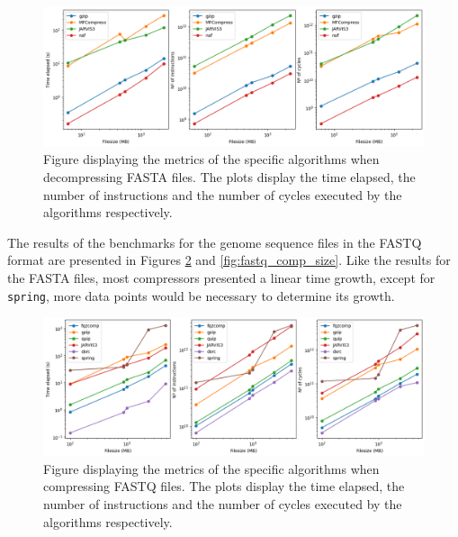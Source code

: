     \begin{figure}[h]
        \centering
        \includegraphics[width=1\textwidth]{figs/fasta_dstats.png}
        \caption[Figure displaying the metrics of the specific algorithms when decompressing FASTA files.] {Figure displaying the metrics of the specific algorithms when decompressing FASTA files. The plots display the time elapsed, the number of instructions and the number of cycles executed by the algorithms respectively.}
        \label{fig:fasta_dstats}
    \end{figure}

    The results of the benchmarks for the genome sequence files in the FASTQ format are presented in Figures \ref{fig:fastq_stats} and \ref{fig:fastq_comp_size}. Like the results for the FASTA files, most compressors presented a linear time growth, except for \texttt{spring}, more data points would be necessary to determine its growth.
    
    \begin{figure}[h]
        \centering
        \includegraphics[width=1\textwidth]{figs/fastq_stats.png}
        \caption[Figure displaying the metrics of the specific algorithms when compressing FASTQ files.] {Figure displaying the metrics of the specific algorithms when compressing FASTQ files. The plots display the time elapsed, the number of instructions and the number of cycles executed by the algorithms respectively.}
        \label{fig:fastq_stats}
    \end{figure}


